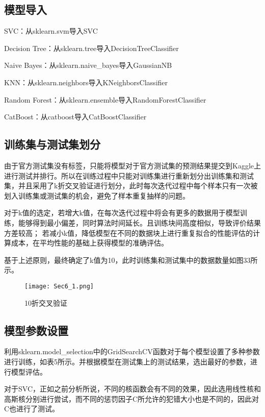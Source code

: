 \documentclass[../main.tex]{subfiles}
\begin{document}
    \subsection{模型导入}
    
        SVC：从sklearn.svm导入SVC

        Decision Tree：从sklearn.tree导入DecisionTreeClassifier

        Naive Bayes：从sklearn.naive\_bayes导入GaussianNB

        KNN：从sklearn.neighbors导入KNeighborsClassifier

        Random Forest：从sklearn.ensemble导入RandomForestClassifier

        CatBoost：从catboost导入CatBoostClassifier

    \subsection{训练集与测试集划分}

        由于官方测试集没有标签，只能将模型对于官方测试集的预测结果提交到Kaggle上进行测试并排行。所以在训练过程中只能对训练集进行重新划分出训练集和测试集，并且采用了k折交叉验证进行划分，此时每次迭代过程中每个样本只有一次被划入训练集或测试集的机会，避免了样本重复抽样的问题。
        
        对于k值的选定，若增大k值，在每次迭代过程中将会有更多的数据用于模型训练，能够得到最小偏差，同时算法时间延长。且训练块间高度相似，导致评价结果方差较高；
        若减小k值，降低模型在不同的数据块上进行重复拟合的性能评估的计算成本，在平均性能的基础上获得模型的准确评估。

        基于上述原则，最终确定了k值为10，此时训练集和测试集中的数据数量如图33所示。

        \begin{figure}[H]
            \centering
            \texttt{[image: Sec6\_1.png]}
            \caption{10折交叉验证}
        \end{figure}

    \subsection{模型参数设置}

        利用sklearn.model\_selection中的GridSearchCV函数对于每个模型设置了多种参数进行训练，如表5所示。并根据模型在测试集上的测试结果，选出最好的参数，进行模型评估。

        对于SVC，正如之前分析所说，不同的核函数会有不同的效果，因此选用线性核和高斯核分别进行尝试，而不同的惩罚因子C所允许的犯错大小也是不同的，因此对C也进行了测试。
\end{document}
